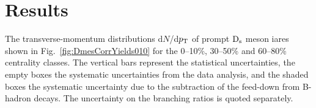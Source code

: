 \section{Results}
\label{sec:PbPbResults}
The transverse-momentum distributions d$N$/d$p_{\rm T}$ of prompt ${\rm D_s}$ meson 
iares shown in Fig.~\ref{fig:DmesCorrYields010}
for the 0--10\%, 30--50\% and 60--80\% centrality classes. 
The vertical bars represent the statistical uncertainties, the empty boxes
the systematic uncertainties from the data analysis, and the shaded boxes
the systematic uncertainty due to the subtraction of the feed-down from 
B-hadron decays. The uncertainty on the branching ratios is quoted separately.\\

